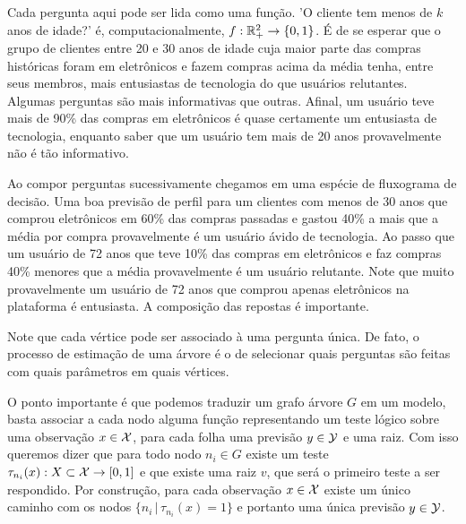 \begin{exemplo}
Cada pergunta aqui pode ser lida como uma função. 'O cliente tem menos de $k$ anos de idade?' é, computacionalmente,  $f: \mathbb{R}^2_+ \to \{0, 1\}$. É de se esperar que o grupo de clientes entre 20 e 30 anos de idade cuja maior parte das compras históricas foram em eletrônicos e fazem compras acima da média tenha, entre seus membros, mais entusiastas de tecnologia do que usuários relutantes. Algumas perguntas são mais informativas que outras. Afinal, um usuário teve mais de 90\% das compras em eletrônicos é quase certamente um entusiasta de tecnologia, enquanto saber que um usuário tem mais de 20 anos provavelmente não é tão informativo. 

Ao compor perguntas sucessivamente chegamos em uma espécie de fluxograma de decisão. Uma boa previsão de perfil para um clientes com menos de 30 anos que comprou eletrônicos em 60\% das compras passadas e gastou 40\% a mais que a média por compra provavelmente é um usuário ávido de tecnologia. Ao passo que um usuário de 72 anos que teve 10\% das compras em eletrônicos e faz compras 40\% menores que a média provavelmente é um usuário relutante. Note que muito provavelmente um usuário de 72 anos que comprou apenas eletrônicos na plataforma é entusiasta. A composição das repostas é importante.

Note que cada vértice pode ser associado à uma pergunta única. De fato, o processo de estimação de uma árvore é o de selecionar quais perguntas são feitas com quais parâmetros em quais vértices. 
\end{exemplo}

O ponto importante é que podemos traduzir um grafo árvore $G$ em um modelo, basta associar a cada nodo alguma função representando um teste lógico sobre uma observação $x \in \mathcal{X}$, para cada folha uma previsão $y \in \mathcal{Y}$ e uma raiz. Com isso queremos dizer que para todo nodo $n_i \in G$ existe um teste $\tau_{n_i}(x) : X \subset \mathcal{X} \to [0, 1]$ e que existe uma raiz $v$, que será o primeiro teste a ser respondido. Por construção, para cada observação $x \in \mathcal{X}$ existe um único caminho com os nodos $ \{n_i \, | \, \tau_{n_i}(x) = 1\}$ e portanto uma única previsão $y \in \mathcal{Y}$. 



